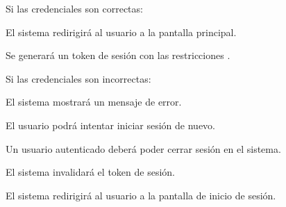 \begin{RFGestionUsuarios}
\begin{RFGestionUsuarios}
      \item Si las credenciales son correctas:
		\begin{RFGestionUsuarios}
			\item El sistema redirigirá al usuario a la pantalla principal.
			\item Se generará un token de sesión con las restricciones .
		\end{RFGestionUsuarios}
	  \item Si las credenciales son incorrectas:
		\begin{RFGestionUsuarios}
			\item El sistema mostrará un mensaje de error.
			\item El usuario podrá intentar iniciar sesión de nuevo.
		\end{RFGestionUsuarios}
    \end{RFGestionUsuarios}

	\item Un usuario autenticado deberá poder cerrar sesión en el sistema.\label{req_cerrar_sesion}
	\begin{RFGestionUsuarios}
		\item El sistema invalidará el token de sesión.
		\item El sistema redirigirá al usuario a la pantalla de inicio de sesión.
	\end{RFGestionUsuarios}

\end{RFGestionUsuarios}